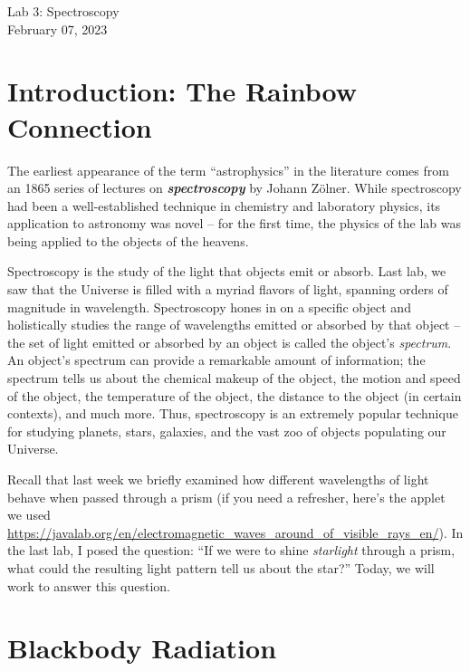 \documentclass[11pt]{article}
\begin{document}
\begin{center}
\huge{Lab 3: Spectroscopy}\\ \medskip \Large{February 07, 2023}
\end{center}

\section{Introduction: The Rainbow Connection}
The earliest appearance of the term ``astrophysics'' in the literature comes from an 1865 series of lectures on \emph{\textbf{spectroscopy}} by Johann Z\"{o}lner. While spectroscopy had been a well-established technique in chemistry and laboratory physics, its application to astronomy was novel -- for the first time, the physics of the lab was being applied to the objects of the heavens. 

Spectroscopy is the study of the light that objects emit or absorb. Last lab, we saw that the Universe is filled with a myriad flavors of light, spanning orders of magnitude in wavelength. Spectroscopy hones in on a specific object and holistically studies the range of wavelengths emitted or absorbed by that object -- the set of light emitted or absorbed by an object is called the object's \emph{spectrum}. An object's spectrum can provide a remarkable amount of information; the spectrum tells us about the chemical makeup of the object, the motion and speed of the object, the temperature of the object, the distance to the object (in certain contexts), and much more. Thus, spectroscopy is an extremely popular technique for studying planets, stars, galaxies, and the vast zoo of objects populating our Universe.


Recall that last week we briefly examined how different wavelengths of light behave when passed through a prism (if you need a refresher, here's the applet we used \url{https://javalab.org/en/electromagnetic_waves_around_of_visible_rays_en/}). In the last lab, I posed the question: ``If we were to shine \emph{starlight} through a prism, what could the resulting light pattern tell us about the star?'' Today, we will work to answer this question.

\section{Blackbody Radiation}
\end{document}
